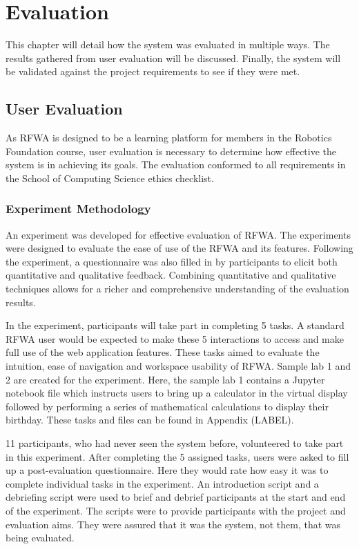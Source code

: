 \documentclass{l4proj}
\begin{document}
\chapter{Evaluation} 
This chapter will detail how the system was evaluated in multiple ways. The results gathered from user evaluation will be discussed. Finally, the system will be validated against the project requirements to see if they were met.

\section{User Evaluation}

As RFWA is designed to be a learning platform for members in the Robotics Foundation course, user evaluation is necessary to determine how effective the system is in achieving its goals. The evaluation conformed to all requirements in the School of Computing Science ethics checklist.

\subsection{Experiment Methodology}

An experiment was developed for effective evaluation of RFWA. The experiments were designed to evaluate the ease of use of the RFWA and its features. Following the experiment, a questionnaire was also filled in by participants to elicit both quantitative and qualitative feedback. Combining quantitative and qualitative techniques allows for a richer and comprehensive understanding of the evaluation results.

In the experiment, participants will take part in completing 5 tasks. A standard RFWA user would be expected to make these 5 interactions to access and make full use of the web application features. These tasks aimed to evaluate the intuition, ease of navigation and workspace usability of RFWA. Sample lab 1 and 2 are created for the experiment. Here, the sample lab 1 contains a Jupyter notebook file which instructs users to bring up a calculator in the virtual display followed by performing a series of mathematical calculations to display their birthday. These tasks and files can be found in Appendix (LABEL). 

11 participants, who had never seen the system before, volunteered to take part in this experiment.  After completing the 5 assigned tasks, users were asked to fill up a post-evaluation questionnaire. Here they would rate how easy it was to complete individual tasks in the experiment. An introduction script and a debriefing script were used to brief and debrief participants at the start and end of the experiment. The scripts were to provide participants with the project and evaluation aims. They were assured that it was the system, not them, that was being evaluated.
\end{document}
